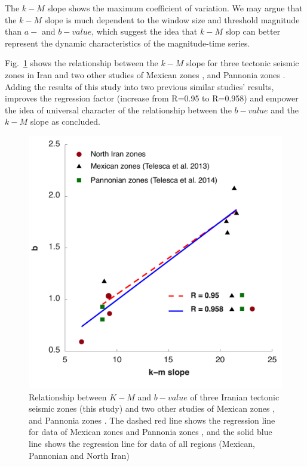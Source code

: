  \noindent
The $k-M$ slope shows the maximum coefficient of variation. We may argue that the $k-M$ slope is much dependent to the window size and threshold magnitude than $a-$ and $b-value$, which suggest the idea that $k-M$ slop can better represent the dynamic characteristics of the magnitude-time series. 
 
 

 
 \noindent
 Fig.~\ref{fig:regression} shows the relationship between the $k-M$ slope for three tectonic seismic zones in Iran and two other studies of Mexican zones \citep{Telesca2013}, and Pannonia zones \citep{Telesca2014}. Adding the results of this study into two previous similar studies' results, improves the regression factor (increase from R=0.95 to R=0.958) and empower the idea of universal character of the relationship between the $b-value$ and the $k-M$ slope as \citet{Telesca2014} concluded. 

\begin{figure} [ht]
\centering
\includegraphics[scale=0.3]{figures/pdf/Figure06.pdf} 
\caption{ Relationship between $K-M$ and $b-value$ of three Iranian tectonic seismic zones (this study) and two other studies of Mexican zones \citep{Telesca2013}, and Pannonia zones \citep{Telesca2014}. The dashed red line shows the regression line for data of  Mexican zones and Pannonia zones \citep{Telesca2014}, and the solid blue line shows the regression line for data of all regions (Mexican, Pannonian and North Iran)}
\label{fig:regression}
\end{figure}

